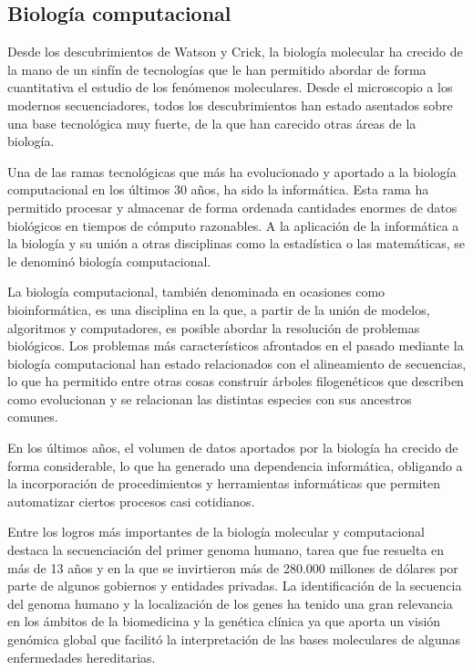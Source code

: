 
\subsection{Biología computacional}

Desde los descubrimientos de Watson y Crick, la biología molecular ha crecido de la mano de un sinfín de tecnologías que le han permitido abordar de forma cuantitativa el estudio de los fenómenos moleculares. Desde el microscopio a los modernos secuenciadores, todos los descubrimientos han estado asentados sobre una base tecnológica muy fuerte, de la que han carecido otras áreas de la biología. 

Una de las ramas tecnológicas que más ha evolucionado y aportado a la biología computacional en los últimos 30 años, ha sido la informática. Esta rama ha  permitido procesar y almacenar de forma ordenada cantidades enormes de datos biológicos en tiempos de cómputo razonables. A la aplicación de la informática a la biología y su unión a otras disciplinas como la estadística o las matemáticas, se le denominó biología computacional.
  
\medskip

La biología computacional, también denominada en ocasiones como bioinformática, es una disciplina en la que, a partir de la unión de modelos, algoritmos y computadores, es posible abordar la resolución de problemas biológicos. Los problemas más característicos afrontados en el pasado mediante la biología computacional han estado relacionados con el alineamiento de secuencias, lo que ha permitido entre otras cosas construir árboles filogenéticos que describen como evolucionan y se relacionan las distintas especies con sus ancestros comunes.

\medskip

En los últimos años, el volumen de datos aportados por la biología ha crecido de forma considerable, lo que ha generado una dependencia informática, obligando a la incorporación de procedimientos y herramientas informáticas que permiten automatizar ciertos procesos casi cotidianos. 

\medskip

Entre los logros más importantes de la biología molecular y computacional destaca la secuenciación del primer genoma humano, tarea que fue resuelta en más de 13 años y en la que se invirtieron más de 280.000 millones de dólares por parte de algunos gobiernos y entidades privadas. La identificación de la secuencia del genoma humano y la localización de los genes ha tenido una gran relevancia en los ámbitos de la biomedicina y la genética clínica ya que aporta un visión genómica global que facilitó la interpretación de las bases moleculares de algunas enfermedades hereditarias.



